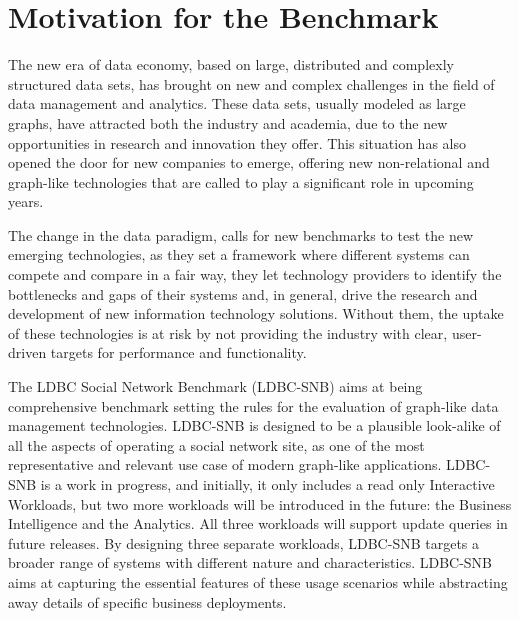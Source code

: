 

\section{Motivation for the Benchmark}

The new era of data economy, based on large, distributed and complexly
structured data sets, has brought on new and complex challenges in the field of
data management and analytics. These data sets, usually modeled as large
graphs, have attracted both the industry and academia, due to the new
opportunities in research and innovation they offer.  This situation has also
opened the door for new companies to emerge, offering new non-relational and
graph-like technologies that are called to play a significant role in upcoming
years.

The change in the data paradigm, calls for new benchmarks to test the  new
emerging technologies, as they set a framework where different systems can
compete and compare in a fair way, they let technology providers to identify
the bottlenecks and gaps of their systems and, in general, drive the research
and development of new information technology solutions. Without them, the
uptake of these technologies is at risk by not providing the industry with
clear, user-driven targets for performance and functionality.

The LDBC Social Network Benchmark (LDBC-SNB) aims at being comprehensive
benchmark setting the rules for the evaluation of graph-like data management
technologies.  LDBC-SNB is designed to be a plausible look-alike of all the
aspects of operating a social network site, as one of the most representative
and relevant use case of modern graph-like applications. LDBC-SNB is a work in
progress, and initially, it only includes a read only Interactive Workloads,
but two more workloads will be introduced in the future: the Business
Intelligence and the Analytics.  All three workloads will support update
queries in future releases. By designing three separate workloads, LDBC-SNB
targets a broader range of systems with different nature and characteristics.
LDBC-SNB aims at capturing the essential features of these usage scenarios
while abstracting away details of specific business deployments. 

